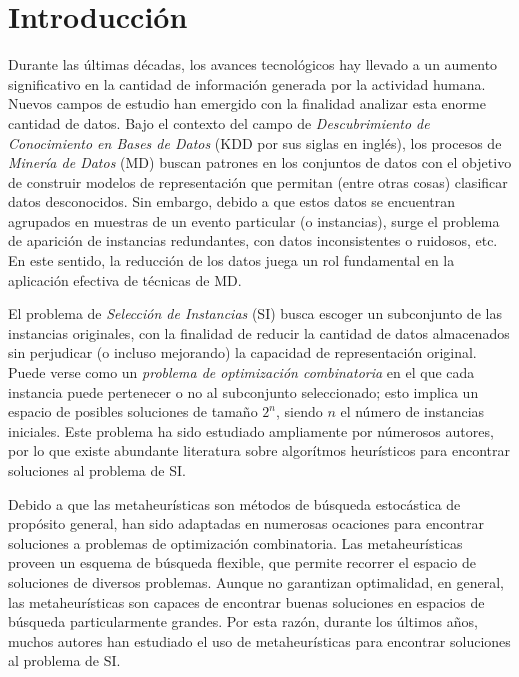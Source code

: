\chapter*{Introducción}
\label{intro}

Durante las últimas décadas, los avances tecnológicos hay llevado a un aumento significativo en la cantidad de información generada por la actividad humana. Nuevos campos de estudio han emergido con la finalidad analizar esta enorme cantidad de datos. Bajo el contexto del campo de \emph{Descubrimiento de Conocimiento en Bases de Datos} (KDD por sus siglas en inglés), los procesos de \emph{Minería de Datos} (MD) buscan patrones en los conjuntos de datos con el objetivo de construir modelos de representación que permitan (entre otras cosas) clasificar datos desconocidos. Sin embargo, debido a que estos datos se encuentran agrupados en muestras de un evento particular (o instancias), surge el problema de aparición de instancias redundantes, con datos inconsistentes o ruidosos, etc. En este sentido, la reducción de los datos juega un rol fundamental en la aplicación efectiva de técnicas de MD.

El problema de \emph{Selección de Instancias} (SI) busca escoger un subconjunto de las instancias originales, con la finalidad de reducir la cantidad de datos almacenados sin perjudicar (o incluso mejorando) la capacidad de representación original. Puede verse como un \emph{problema de optimización combinatoria} en el que cada instancia puede pertenecer o no al subconjunto seleccionado; esto implica un espacio de posibles soluciones de tamaño $2^n$, siendo $n$ el número de instancias iniciales. Este problema ha sido estudiado ampliamente por númerosos autores, por lo que existe abundante literatura sobre algorítmos heurísticos para encontrar soluciones al problema de SI.

Debido a que las metaheurísticas son métodos de búsqueda estocástica de propósito general, han sido adaptadas en numerosas ocaciones para encontrar soluciones a problemas de optimización combinatoria. Las metaheurísticas proveen un esquema de búsqueda flexible, que permite recorrer el espacio de soluciones de diversos problemas. Aunque no garantizan optimalidad, en general, las metaheurísticas son capaces de encontrar buenas soluciones en espacios de búsqueda particularmente grandes. Por esta razón, durante los últimos años, muchos autores han estudiado el uso de metaheurísticas para encontrar soluciones al problema de SI.

